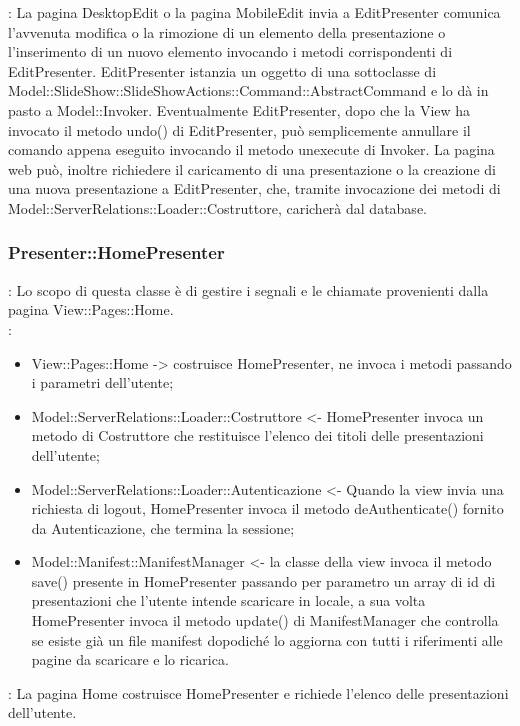 {{\begin{itemize}
		\end{itemize} 
		\textbf{\interfacce}: La pagina DesktopEdit o la pagina MobileEdit invia a EditPresenter comunica l’avvenuta modifica o la rimozione di un elemento della presentazione o l’inserimento di un nuovo elemento invocando i metodi corrispondenti di EditPresenter. EditPresenter istanzia un oggetto di una sottoclasse di Model::SlideShow::SlideShowActions::Command::AbstractCommand e lo dà in pasto a Model::Invoker. Eventualmente EditPresenter, dopo che la View ha invocato il metodo undo() di EditPresenter, può semplicemente annullare il comando appena eseguito invocando il metodo unexecute di Invoker.
		La pagina web può, inoltre richiedere il caricamento di una presentazione o la creazione di una nuova presentazione a EditPresenter, che, tramite invocazione dei metodi di Model::ServerRelations::Loader::Costruttore, caricherà dal database.
		\\
	}
	\subsubsection{Presenter::HomePresenter}{
				\textbf{\tipo}: Lo scopo di questa classe è di gestire i segnali e le chiamate provenienti dalla pagina View::Pages::Home.\\	
				\textbf{\relaz}:
				\begin{itemize}
					\item View::Pages::Home -> costruisce HomePresenter, ne invoca i metodi passando i parametri dell’utente;
					\item Model::ServerRelations::Loader::Costruttore <- HomePresenter invoca un metodo di Costruttore che restituisce l’elenco dei titoli delle presentazioni dell’utente;
					\item Model::ServerRelations::Loader::Autenticazione <- Quando la view invia una richiesta di logout, HomePresenter invoca il metodo deAuthenticate() fornito da Autenticazione, che termina la sessione;
					\item Model::Manifest::ManifestManager <- la classe della view invoca il metodo save() presente in  HomePresenter passando per parametro un array di id di presentazioni che l'utente intende scaricare in locale, a sua volta HomePresenter invoca il metodo update() di ManifestManager che controlla se esiste già un file manifest dopodiché lo aggiorna con tutti i riferimenti alle pagine da scaricare e lo ricarica. 					
				\end{itemize} 
				\textbf{\interfacce}: La pagina Home costruisce HomePresenter e richiede l’elenco delle presentazioni dell’utente.\\
			}
}
